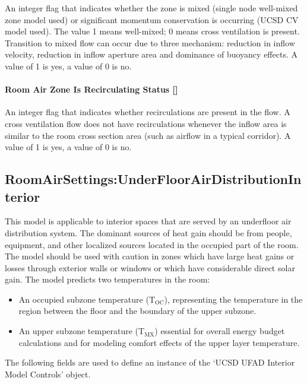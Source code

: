 An integer flag that indicates whether the zone is mixed (single node well-mixed zone model used) or significant momentum conservation is occurring (UCSD CV model used). The value 1 means well-mixed; 0 means cross ventilation is present. Transition to mixed flow can occur due to three mechanism: reduction in inflow velocity, reduction in inflow aperture area and dominance of buoyancy effects. A value of 1 is yes, a value of 0 is no.

\paragraph{Room Air Zone Is Recirculating Status {[]}}\label{room-air-zone-is-recirculating-status}

An integer flag that indicates whether recirculations are present in the flow. A cross ventilation flow does not have recirculations whenever the inflow area is similar to the room cross section area (such as airflow in a typical corridor). A value of 1 is yes, a value of 0 is no.

\subsection{RoomAirSettings:UnderFloorAirDistributionInterior}\label{roomairsettingsunderfloorairdistributioninterior}

This model is applicable to interior spaces that are served by an underfloor air distribution system. The dominant sources of heat gain should be from people, equipment, and other localized sources located in the occupied part of the room. The model should be used with caution in zones which have large heat gains or losses through exterior walls or windows or which have considerable direct solar gain. The model predicts two temperatures in the room:

\begin{itemize}
\item
  An occupied subzone temperature (T\(_{\mathrm{OC}}\)), representing the temperature in the region between the floor and the boundary of the upper subzone.
\item
  An upper subzone temperature (T\(_{\mathrm{MX}}\)) essential for overall energy budget calculations and for modeling comfort effects of the upper layer temperature.
\end{itemize}

The following fields are used to define an instance of the `UCSD UFAD Interior Model Controls' object.

